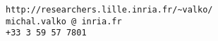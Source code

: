 \renewcommand{\categoryfont}{\sc}

\def\Cplusplus{{\rm C\raise.5ex\hbox{\small ++}}}

%
% 
\setlength{\oddsidemargin}{1in}
\setlength{\marginparwidth}{1in}
% 
%
\addtolength{\marginparwidth}{-\marginparsep}
 \setlength{\evensidemargin}{\oddsidemargin}
 \setlength{\textwidth}{\paperwidth}
 \addtolength{\textwidth}{-2in}
 \addtolength{\textwidth}{-2\oddsidemargin}
 \addtolength{\textwidth}{\marginparwidth}
 \addtolength{\textwidth}{\marginparsep}
%
%
\setlength{\topmargin}{-0.5in}
%
%
\renewcommand{\labelcitem}{$\diamond$}
\renewcommand{\labelitemi}{$\cdot$}
\newcommand{\first}{$1^{\mbox{\scriptsize st}}$\ }
\newcommand{\second}{$2^{\mbox{\scriptsize nd}}$\ }
\newcommand{\third}{$3^{\mbox{\scriptsize rd}}$\ }
\newcommand{\fourth}{$4^{\mbox{\scriptsize th}}$\ }
\newcommand{\fifth}{$5^{\mbox{\scriptsize th}}$\ }
\newcommand{\sixth}{$6^{\mbox{\scriptsize th}}$\ }
\newcommand{\nineth}{$9^{\mbox{\scriptsize th}}$\ }
\newcommand{\comment}[1]{}


\author{Michal Valko}

\address{Stealth Startup\\
	San Francisco, California, US\\
	Paris, France\\		
	}{
	\mbox{\small\tt http://researchers.lille.inria.fr/\~{}valko/}\\
	\mbox{\small\tt michal.valko\,@\,inria.fr}\\
	\mbox{\small\tt +33 3 59 57 7801}\\
}
